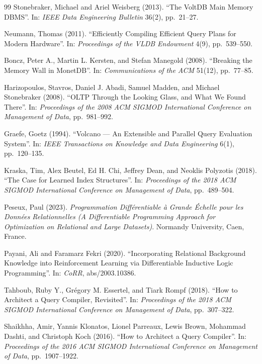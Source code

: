 \documentclass[12pt]{report}
\begin{document}
\begin{thebibliography}{99}
Stonebraker, Michael and Ariel Weisberg (2013).
``The VoltDB Main Memory DBMS''.
In: \textit{IEEE Data Engineering Bulletin} 36(2),
pp.~21--27.

Neumann, Thomas (2011).
``Efficiently Compiling Efficient Query Plans for Modern Hardware''.
In: \textit{Proceedings of the VLDB Endowment} 4(9),
pp.~539--550.

Boncz, Peter A., Martin L. Kersten,
and Stefan Manegold (2008).
``Breaking the Memory Wall in MonetDB''.
In: \textit{Communications of the ACM} 51(12),
pp.~77--85.

Harizopoulos, Stavros, Daniel J. Abadi,
Samuel Madden, and Michael Stonebraker (2008).
``OLTP Through the Looking Glass, and What We Found There''.
In: \textit{Proceedings of the 2008 ACM SIGMOD International Conference on Management of Data},
pp.~981--992.

Graefe, Goetz (1994).
``Volcano --- An Extensible and Parallel Query Evaluation System''.
In: \textit{IEEE Transactions on Knowledge and Data Engineering} 6(1),
pp.~120--135.


Kraska, Tim, Alex Beutel, Ed H. Chi,
Jeffrey Dean, and Neoklis Polyzotis (2018).
``The Case for Learned Index Structures''.
In: \textit{Proceedings of the 2018 ACM SIGMOD International Conference on Management of Data},
pp.~489--504.

Peseux, Paul (2023).
\textit{Programmation Diff\'erentiable \`a Grande \'Echelle pour les Donn\'ees Relationnelles
(A Differentiable Programming Approach for Optimization on Relational and Large Datasets)}.
Normandy University, Caen, France.

Payani, Ali and Faramarz Fekri (2020).
``Incorporating Relational Background Knowledge into Reinforcement Learning via Differentiable Inductive Logic Programming''.
In: \textit{CoRR}, abs/2003.10386.

Tahboub, Ruby Y., Gr\'egory M. Essertel,
and Tiark Rompf (2018).
``How to Architect a Query Compiler, Revisited''.
In: \textit{Proceedings of the 2018 ACM SIGMOD International Conference on Management of Data},
pp.~307--322.

Shaikhha, Amir, Yannis Klonatos,
Lionel Parreaux, Lewis Brown,
Mohammad Dashti, and Christoph Koch (2016).
``How to Architect a Query Compiler''.
In: \textit{Proceedings of the 2016 ACM SIGMOD International Conference on Management of Data},
pp.~1907--1922.


\end{thebibliography}
\end{document}
